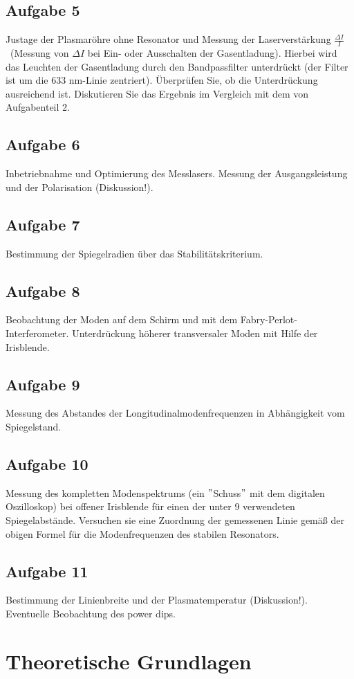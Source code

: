 \documentclass[a4paper, parskip=half]{scrartcl}
\begin{document}
\subsection*{Aufgabe 5}
Justage der Plasmaröhre ohne Resonator und Messung der Laserverstärkung \(\frac{\Delta I}{I}\)\ (Messung von \(\Delta I\) bei Ein- oder Ausschalten der Gasentladung). Hierbei wird das 
Leuchten der Gasentladung durch den Bandpassfilter unterdrückt (der Filter ist um die 633 nm-Linie zentriert). Überprüfen Sie, ob die Unterdrückung ausreichend ist. 
Diskutieren Sie das Ergebnis im Vergleich mit dem von Aufgabenteil 2. 

\subsection*{Aufgabe 6}
Inbetriebnahme und Optimierung des Messlasers. Messung der Ausgangsleistung und der Polarisation (Diskussion!). 

\subsection*{Aufgabe 7}
Bestimmung der Spiegelradien über das Stabilitätskriterium.

\subsection*{Aufgabe 8}
Beobachtung der Moden auf dem Schirm und mit dem Fabry-Perlot-Interferometer. Unterdrückung höherer transversaler Moden mit Hilfe der Irisblende.

\subsection*{Aufgabe 9}
Messung des Abstandes der Longitudinalmodenfrequenzen  in Abhängigkeit vom Spiegelstand.

\subsection*{Aufgabe 10}
Messung des kompletten Modenspektrums (ein \("\)Schuss\("\) mit dem digitalen Oszilloskop) bei offener Irisblende für einen der unter 9 verwendeten Spiegelabstände. Versuchen sie eine Zuordnung der gemessenen Linie gemäß der obigen Formel für die Modenfrequenzen des stabilen Resonators.

\subsection*{Aufgabe 11}
Bestimmung der Linienbreite und der Plasmatemperatur (Diskussion!). Eventuelle Beobachtung des power dips.

\section{Theoretische Grundlagen}


\end{document}
